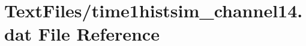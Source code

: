 \hypertarget{TextFiles_2time1histsim__channel14_8dat}{}\section{Text\+Files/time1histsim\+\_\+channel14.dat File Reference}
\label{TextFiles_2time1histsim__channel14_8dat}
